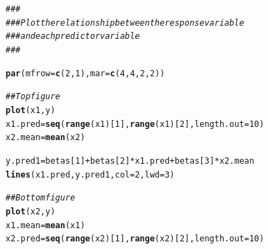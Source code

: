 \documentclass{article}\usepackage[]{graphicx}\usepackage[]{color}
\makeatletter
\newcommand{\hlnum}[1]{\textcolor[rgb]{0.686,0.059,0.569}{#1}}%
\newcommand{\hlcom}[1]{\textcolor[rgb]{0.678,0.584,0.686}{\textit{#1}}}%
\newcommand{\hlopt}[1]{\textcolor[rgb]{0,0,0}{#1}}%
\newcommand{\hlstd}[1]{\textcolor[rgb]{0.345,0.345,0.345}{#1}}%
\newcommand{\hlkwb}[1]{\textcolor[rgb]{0.69,0.353,0.396}{#1}}%
\newcommand{\hlkwc}[1]{\textcolor[rgb]{0.333,0.667,0.333}{#1}}%
\newcommand{\hlkwd}[1]{\textcolor[rgb]{0.737,0.353,0.396}{\textbf{#1}}}%
\newenvironment{kframe}{%
 \def\at@end@of@kframe{}%
 \ifinner\ifhmode%
  \def\at@end@of@kframe{\end{minipage}}%
  \begin{minipage}{\columnwidth}%
 \fi\fi%
 \def\FrameCommand##1{\hskip\@totalleftmargin \hskip-\fboxsep
 \colorbox{shadecolor}{##1}\hskip-\fboxsep
     \hskip-\linewidth \hskip-\@totalleftmargin \hskip\columnwidth}%
 \MakeFramed {\advance\hsize-\width
   \@totalleftmargin\z@ \linewidth\hsize
   \@setminipage}}%
 {\par\unskip\endMakeFramed%
 \at@end@of@kframe}
\newenvironment{knitrout}{}{} %
\makeatother
\begin{document}
\begin{figure}
\begin{knitrout}
\color{fgcolor}\begin{kframe}
\begin{alltt}
\hlcom{###}
\hlcom{### Plot the relationship between the response variable}
\hlcom{### and each predictor variable}
\hlcom{###}

\hlkwd{par}\hlstd{(}\hlkwc{mfrow}\hlstd{=}\hlkwd{c}\hlstd{(}\hlnum{2}\hlstd{,}\hlnum{1}\hlstd{),}\hlkwc{mar}\hlstd{=}\hlkwd{c}\hlstd{(}\hlnum{4}\hlstd{,}\hlnum{4}\hlstd{,}\hlnum{2}\hlstd{,}\hlnum{2}\hlstd{))}

\hlcom{## Top figure}
\hlkwd{plot}\hlstd{(x1,y)}
\hlstd{x1.pred}\hlkwb{=}\hlkwd{seq}\hlstd{(}\hlkwd{range}\hlstd{(x1)[}\hlnum{1}\hlstd{],}\hlkwd{range}\hlstd{(x1)[}\hlnum{2}\hlstd{],}\hlkwc{length.out}\hlstd{=}\hlnum{10}\hlstd{)}
\hlstd{x2.mean}\hlkwb{=}\hlkwd{mean}\hlstd{(x2)}

\hlstd{y.pred1}\hlkwb{=}\hlstd{betas[}\hlnum{1}\hlstd{]}\hlopt{+}\hlstd{betas[}\hlnum{2}\hlstd{]}\hlopt{*}\hlstd{x1.pred}\hlopt{+}\hlstd{betas[}\hlnum{3}\hlstd{]}\hlopt{*}\hlstd{x2.mean}
\hlkwd{lines}\hlstd{(x1.pred,y.pred1,}\hlkwc{col}\hlstd{=}\hlnum{2}\hlstd{,}\hlkwc{lwd}\hlstd{=}\hlnum{3}\hlstd{)}

\hlcom{## Bottom figure}
\hlkwd{plot}\hlstd{(x2,y)}
\hlstd{x1.mean}\hlkwb{=}\hlkwd{mean}\hlstd{(x1)}
\hlstd{x2.pred}\hlkwb{=}\hlkwd{seq}\hlstd{(}\hlkwd{range}\hlstd{(x2)[}\hlnum{1}\hlstd{],}\hlkwd{range}\hlstd{(x2)[}\hlnum{2}\hlstd{],}\hlkwc{length.out}\hlstd{=}\hlnum{10}\hlstd{)}


\end{alltt}
\end{kframe}
\end{knitrout}
\end{figure}
\end{document}
